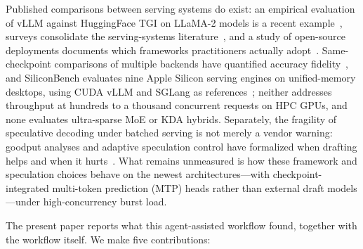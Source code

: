 \documentclass[11pt]{article}
\begin{document}
Published comparisons between serving systems do exist: an empirical evaluation of vLLM against HuggingFace TGI on LLaMA-2 models is a recent example~\cite{kolluru2025tgi}, surveys consolidate the serving-systems literature~\cite{li2024survey}, and a study of open-source deployments documents which frameworks practitioners actually adopt~\cite{majidi2026wild}. Same-checkpoint comparisons of multiple backends have quantified accuracy fidelity~\cite{pape2026silent}, and SiliconBench evaluates nine Apple Silicon serving engines on unified-memory desktops, using CUDA vLLM and SGLang as references~\cite{zhang2026siliconbench}; neither addresses throughput at hundreds to a thousand concurrent requests on HPC GPUs, and none evaluates ultra-sparse MoE or KDA hybrids. Separately, the fragility of speculative decoding under batched serving is not merely a vendor warning: goodput analyses and adaptive speculation control have formalized when drafting helps and when it hurts~\cite{liu2024turbospec,li2025adaserve}. What remains unmeasured is how these framework and speculation choices behave on the newest architectures---with checkpoint-integrated multi-token prediction (MTP) heads rather than external draft models---under high-concurrency burst load.

The present paper reports what this agent-assisted workflow found, together with the workflow itself. We make five contributions:
\end{document}
